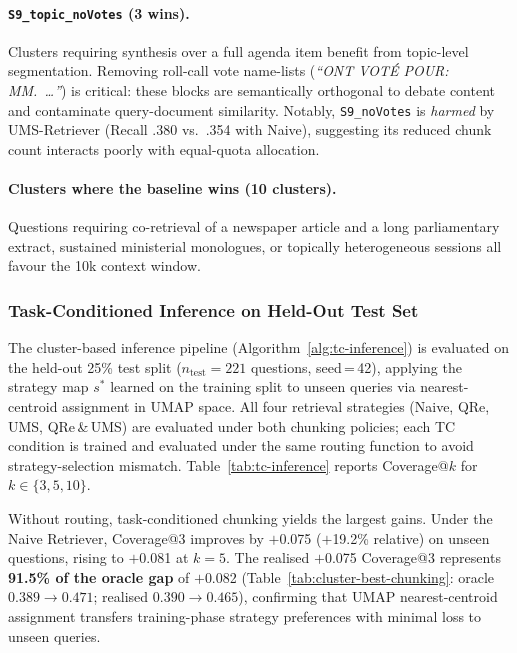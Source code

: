 \paragraph{\texttt{S9\_topic\_noVotes} (3 wins).}
Clusters requiring synthesis over a full agenda item benefit from topic-level
segmentation.
Removing roll-call vote name-lists (\textit{``ONT VOT\'{E} POUR: MM.~\ldots''})
is critical: these blocks are semantically orthogonal to debate content and
contaminate query-document similarity.
Notably, \texttt{S9\_noVotes} is \emph{harmed} by UMS-Retriever (Recall .380
vs.\ .354 with Naive), suggesting its reduced chunk count interacts poorly with
equal-quota allocation.

\paragraph{Clusters where the baseline wins (10 clusters).}
Questions requiring co-retrieval of a newspaper article and a long parliamentary
extract, sustained ministerial monologues, or topically heterogeneous sessions
all favour the 10k context window.

\subsubsection{Task-Conditioned Inference on Held-Out Test Set}
\label{sec:tc-inference-results}

The cluster-based inference pipeline (Algorithm~\ref{alg:tc-inference}) is
evaluated on the held-out 25\% test split ($n_{\text{test}}{=}221$ questions,
seed\,=\,42), applying the strategy map $s^*$ learned on the training split to
unseen queries via nearest-centroid assignment in UMAP space.
All four retrieval strategies (Naive, QRe, UMS, QRe\,\&\,UMS) are evaluated
under both chunking policies; each TC condition is trained and evaluated under
the same routing function to avoid strategy-selection mismatch.
Table~\ref{tab:tc-inference} reports Coverage@$k$ for $k \in \{3,5,10\}$.

Without routing, task-conditioned chunking yields the largest gains. Under the Naive Retriever, Coverage@3 improves by $+$0.075 ($+$19.2\% relative)
on unseen questions, rising to $+$0.081 at $k{=}5$.
The realised $+$0.075 Coverage@3 represents \textbf{91.5\% of the oracle gap}
of $+$0.082 (Table~\ref{tab:cluster-best-chunking}: oracle $0.389 \to 0.471$;
realised $0.390 \to 0.465$), confirming that UMAP nearest-centroid assignment
transfers training-phase strategy preferences with minimal loss to unseen queries.

